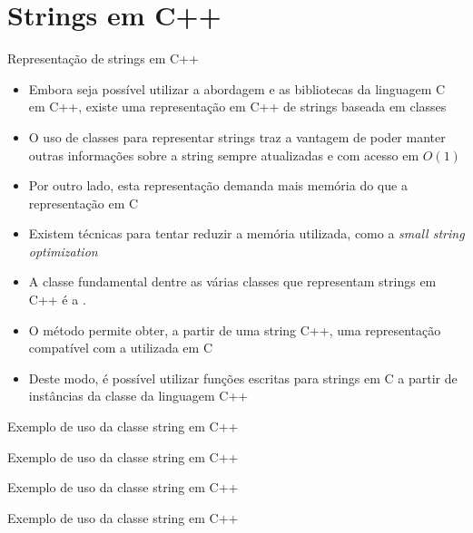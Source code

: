 \section{Strings em C++}

\begin{frame}[fragile]{Representação de strings em C++}

    \begin{itemize}
        \item Embora seja possível utilizar a abordagem e as bibliotecas da linguagem C em C++, 
            existe uma representação em C++ de strings baseada em classes

        \item O uso de classes para representar strings traz a vantagem de poder manter outras 
            informações sobre a string sempre atualizadas e com acesso em $O(1)$

        \item Por outro lado, esta representação demanda mais memória do que a representação em C

        \item Existem técnicas para tentar reduzir a memória utilizada, como a \textit{small string optimization}

        \item A classe fundamental dentre as várias classes que representam strings em C++ é a
            .

        \item O método  permite obter, a partir de uma string C++, uma 
            representação compatível com a utilizada em C

        \item Deste modo, é possível utilizar funções escritas para strings em C a partir de 
            instâncias da classe da linguagem C++
    \end{itemize}

\end{frame}

\begin{frame}[fragile]{Exemplo de uso da classe string em C++}
\end{frame}

\begin{frame}[fragile]{Exemplo de uso da classe string em C++}
\end{frame}

\begin{frame}[fragile]{Exemplo de uso da classe string em C++}
\end{frame}

\begin{frame}[fragile]{Exemplo de uso da classe string em C++}
\end{frame}
